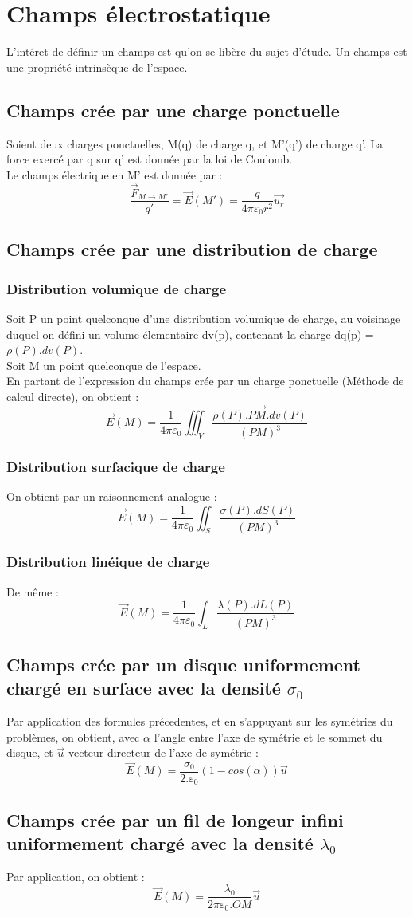 \section{Champs électrostatique}
L'intéret de définir un champs est qu'on se libère du sujet d'étude. Un champs est une propriété intrinsèque de l'espace.
\subsection{Champs crée par une charge ponctuelle}
\begin{de}
Soient deux charges ponctuelles, M(q) de charge q, et M'(q') de charge q'. La force exercé par q sur q' est donnée par la loi de Coulomb.\\
Le champs électrique en M' est donnée par : 
$$\dfrac{\overrightarrow{F}_{M \rightarrow M'}}{q'} = \overrightarrow{E}(M') = \dfrac{q}{4\pi \varepsilon_0 r^2} \overrightarrow{u_r} $$
\end{de}
\subsection{Champs crée par une distribution de charge}
\subsubsection{Distribution volumique de charge}
Soit P un point quelconque d'une distribution volumique de charge, au voisinage duquel on défini un volume élementaire dv(p), contenant la charge dq(p) = $\rho(P).dv(P)$.\\
Soit M un point quelconque de l'espace.\\
En partant de l'expression du champs crée par un charge ponctuelle (Méthode de calcul directe), on obtient : 
$$\overrightarrow{E}(M) = \dfrac{1}{4\pi\varepsilon_0} \iiint_V \dfrac{\rho(P).\overrightarrow{PM}.dv(P)}{(PM)^3}$$
\subsubsection{Distribution surfacique de charge}
On obtient par un raisonnement analogue :
$$\overrightarrow{E}(M) = \dfrac{1}{4\pi\varepsilon_0} \iint_S \dfrac{\sigma(P).dS(P)}{(PM)^3}$$
\subsubsection{Distribution linéique de charge}
De même :
$$\overrightarrow{E}(M) = \dfrac{1}{4\pi\varepsilon_0} \int_L \dfrac{\lambda(P).dL(P)}{(PM)^3}$$
\subsection{Champs crée par un disque uniformement chargé en surface avec la densité $\sigma_0$}
Par application des formules précedentes, et en s'appuyant sur les symétries du problèmes, on obtient, avec $\alpha$ l'angle entre l'axe de symétrie et le sommet du disque, et $\overrightarrow{u}$ vecteur directeur de l'axe de symétrie : 
$$\overrightarrow{E}(M) = \dfrac{\sigma_0}{2.\varepsilon_0}(1 - cos(\alpha))\overrightarrow{u}$$
\subsection{Champs crée par un fil de longeur infini uniformement chargé avec la densité $\lambda_0$}
Par application, on obtient : 
$$\overrightarrow{E}(M) = \dfrac{\lambda_0}{2\pi\varepsilon_0.OM} \overrightarrow{u}$$
